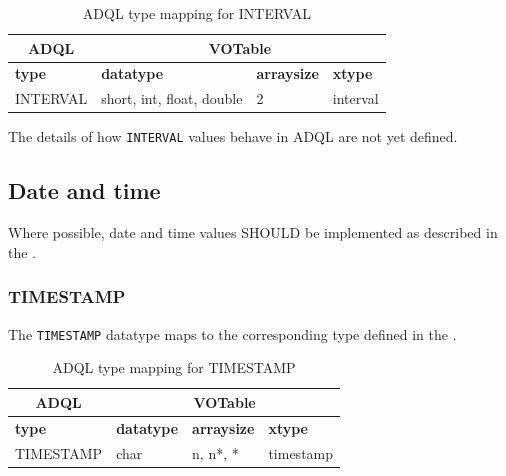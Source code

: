 \documentclass[11pt,a4paper]{ivoa}
\begin{document}
\begin{table}[h]\footnotesize
    \begin{tabular}
        {|p{}|p{}|p{}|p{}|}

        \hline
        \multicolumn{1}{|c|}{\textbf{ADQL}} &
        \multicolumn{3}{|c|}{\textbf{VOTable}}
        \tabularnewline

        \hline
        \textbf{type} &
        \textbf{datatype} &
        \textbf{arraysize} &
        \textbf{xtype}
        \tabularnewline

        \hline
        INTERVAL &
        short, int, float, double &
        2 &
        interval
        \tabularnewline
        \hline
    \end{tabular}
    \caption{ADQL type mapping for INTERVAL}
    \label{table:types.numeric.interval}
\end{table}

The details of how \verb:INTERVAL: values behave in ADQL are not yet
defined.

\subsection{Date and time}
\label{sec:types.datetime}

Where possible, date and time values SHOULD be implemented as described in the
\DALISpec{}.

\subsubsection{TIMESTAMP}
\label{sec:types.datetime.timestamp}

The \verb:TIMESTAMP: datatype maps to the corresponding type defined in the
\DALISpec{}.

\begin{table}[h]\footnotesize
    \begin{tabular}
        {|p{}|p{}|p{}|p{}|}

        \hline
        \multicolumn{1}{|c|}{\textbf{ADQL}} &
        \multicolumn{3}{|c|}{\textbf{VOTable}}
        \tabularnewline

        \hline
        \textbf{type} &
        \textbf{datatype} &
        \textbf{arraysize} &
        \textbf{xtype}
        \tabularnewline

        \hline
        TIMESTAMP &
        char &
        n, n*, * &
        timestamp
        \tabularnewline
        \hline
    \end{tabular}
    \caption{ADQL type mapping for TIMESTAMP}
    \label{table:types.datetime.timestamp}
\end{table}
\end{document}
